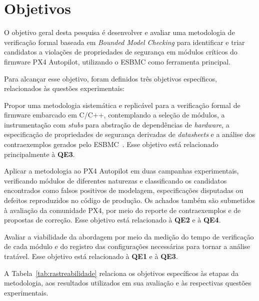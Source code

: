 \section{Objetivos}
\label{sec:objetivos}

O objetivo geral desta pesquisa é desenvolver e avaliar uma metodologia de verificação formal baseada em \textit{Bounded Model Checking} para identificar e triar candidatos a violações de propriedades de segurança em módulos críticos do firmware PX4 Autopilot, utilizando o ESBMC como ferramenta principal.

Para alcançar esse objetivo, foram definidos três objetivos específicos, relacionados às questões experimentais:

\begin{description}[leftmargin=1.5cm, style=nextline, font=\normalfont\bfseries]

\item[O1] Propor uma metodologia sistemática e replicável para a verificação formal de firmware embarcado em C/C++, contemplando a seleção de módulos, a instrumentação com \textit{stubs} para abstração de dependências de \textit{hardware}, a especificação de propriedades de segurança derivadas de \textit{datasheets} e a análise dos contraexemplos gerados pelo ESBMC~\cite{Cordeiro2012}. Esse objetivo está relacionado principalmente à \textbf{QE3}.

\item[O2] Aplicar a metodologia ao PX4 Autopilot em duas campanhas experimentais, verificando módulos de diferentes naturezas e classificando os candidatos encontrados como falsos positivos de modelagem, especificações disputadas ou defeitos reproduzidos no código de produção. Os achados também são submetidos à avaliação da comunidade PX4, por meio do reporte de contraexemplos e de propostas de correção. Esse objetivo está relacionado à \textbf{QE2} e à \textbf{QE4}.

\item[O3] Avaliar a viabilidade da abordagem por meio da medição do tempo de verificação de cada módulo e do registro das configurações necessárias para tornar a análise tratável. Esse objetivo está relacionado à \textbf{QE1} e à \textbf{QE3}.

\end{description}

A Tabela~\ref{tab:rastreabilidade} relaciona os objetivos específicos às etapas da metodologia, aos resultados utilizados em sua avaliação e às respectivas questões experimentais.

